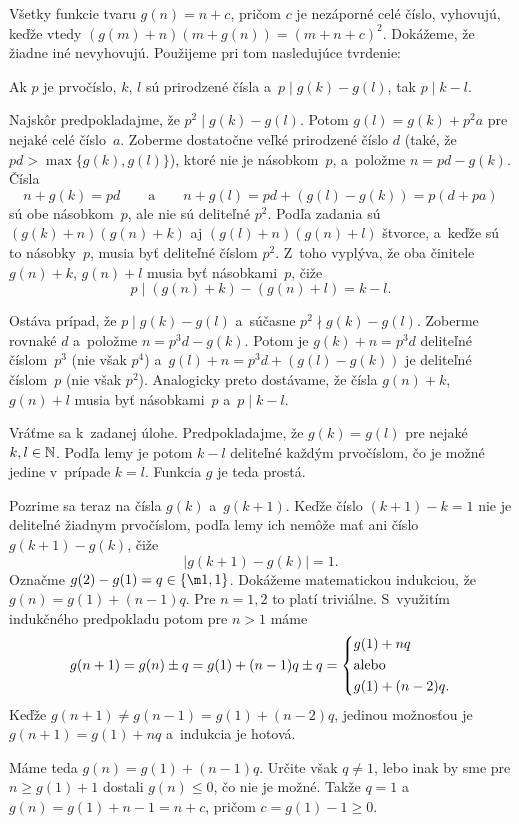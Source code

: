 {%
Všetky funkcie tvaru $g(n)=n+c$, pričom $c$ je nezáporné celé číslo, vyhovujú, keďže vtedy $(g(m)+n)(m+g(n))=(m+n+c)^2$. Dokážeme, že žiadne iné nevyhovujú. Použijeme pri tom nasledujúce tvrdenie:

\Lema
Ak $p$ je prvočíslo, $k$, $l$ sú prirodzené čísla a~$p\mid g(k)-g(l)$, tak $p\mid k-l$.

\dokaz
Najskôr predpokladajme, že $p^2\mid g(k)-g(l)$. Potom $g(l)=g(k)+p^2a$ pre nejaké celé číslo~$a$. Zoberme dostatočne veľké prirodzené číslo $d$ (také, že $pd>\max\{g(k),g(l)\}$), ktoré nie je násobkom~$p$, a~položme $n=pd-g(k)$. Čísla
$$
n+g(k)=pd\qquad\text{a}\qquad n+g(l)=pd+(g(l)-g(k))=p(d+pa)
$$
sú obe násobkom~$p$, ale nie sú deliteľné $p^2$. Podľa zadania sú $(g(k)+n)(g(n)+k)$ aj $(g(l)+n)(g(n)+l)$ štvorce, a~keďže sú to násobky~$p$, musia byť deliteľné číslom $p^2$. Z~toho vyplýva, že oba činitele $g(n)+k$, $g(n)+l$ musia byť násobkami~$p$, čiže
$$
p\mid (g(n)+k)-(g(n)+l)=k-l.
$$

Ostáva prípad, že $p\mid g(k)-g(l)$ a~súčasne $p^2\nmid g(k)-g(l)$. Zoberme rovnaké $d$ a~položme $n=p^3d-g(k)$. Potom je $g(k)+n=p^3d$ deliteľné číslom~$p^3$ (nie však $p^4$) a~$g(l)+n=p^3d+(g(l)-g(k))$ je deliteľné číslom~$p$ (nie však $p^2$). Analogicky preto dostávame, že čísla $g(n)+k$, $g(n)+l$ musia byť násobkami~$p$ a~$p\mid k-l$.

\smallskip
Vráťme sa k~zadanej úlohe. Predpokladajme, že $g(k)=g(l)$ pre nejaké $k,l\in\Bbb N$. Podľa lemy je potom $k-l$ deliteľné každým prvočíslom, čo je možné jedine v~prípade $k=l$. Funkcia $g$ je teda prostá.

Pozrime sa teraz na čísla $g(k)$ a~$g(k+1)$. Keďže číslo $(k+1)-k=1$ nie je deliteľné žiadnym prvočíslom, podľa lemy ich nemôže mať ani číslo $g(k+1)-g(k)$, čiže
$$
|g(k+1)-g(k)|=1.
$$
Označme $g(2)-g(1)=q\in\{\m1,1\}$. Dokážeme matematickou indukciou, že $g(n)=g(1)+(n-1)q$. Pre $n=1,2$ to platí triviálne. S~využitím indukčného predpokladu potom pre $n>1$ máme
$$
g(n+1)=g(n)\pm q=g(1)+(n-1)q\pm q=
\left\{
\aligned
&g(1)+nq\\
&\text{alebo}\\
&g(1)+(n-2)q.
\endaligned
\right.
$$
Keďže $g(n+1)\ne g(n-1)=g(1)+(n-2)q$, jedinou možnosťou je $g(n+1)=g(1)+nq$ a~indukcia je hotová.

Máme teda $g(n)=g(1)+(n-1)q$. Určite však $q\ne1$, lebo inak by sme pre $n\ge g(1)+1$ dostali $g(n)\le0$, čo nie je možné. Takže $q=1$ a~$g(n)=g(1)+n-1=n+c$, pričom $c=g(1)-1\ge0$.
}

